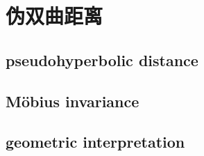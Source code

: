 \section{伪双曲距离}
\label{b3:sec:0602}


\subsection{pseudohyperbolic distance}
\label{b3:subsec:060201}

\subsection{Möbius invariance}
\label{b3:subsec:060202}

\subsection{geometric interpretation}
\label{b3:subsec:060203}


